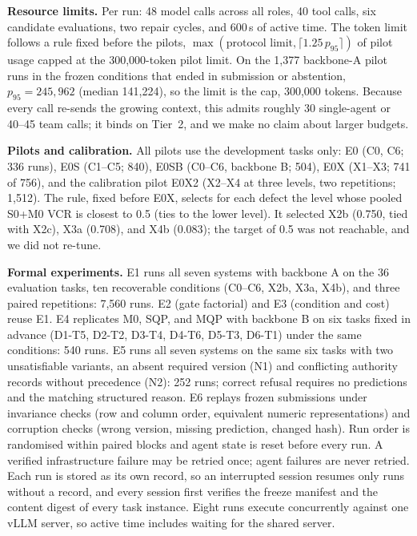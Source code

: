 \documentclass[conference]{IEEEtran}
\newcommand{\sys}[1]{\textsf{#1}}
\begin{document}
\textbf{Resource limits.} Per run: 48 model calls across all roles, 40 tool calls, six candidate evaluations, two
repair cycles, and 600\,s of active time. The token limit follows a rule fixed before the pilots,
$\max(\text{protocol limit},\lceil1.25\,p_{95}\rceil)$ of pilot usage capped at the 300,000-token pilot limit. On the
1,377 backbone-A pilot runs in the frozen conditions that ended in submission or abstention, $p_{95}=245{,}962$
(median 141,224), so the limit is the cap, 300,000 tokens. Because every call re-sends the growing context, this
admits roughly 30 single-agent or 40--45 team calls; it binds on Tier~2, and we make no claim about larger budgets.

\textbf{Pilots and calibration.} All pilots use the development tasks only: E0 (C0, C6; 336 runs), E0S (C1--C5; 840),
E0SB (C0--C6, backbone B; 504), E0X (X1--X3; 741 of 756), and the calibration pilot E0X2 (X2--X4 at three levels,
two repetitions; 1,512). The rule, fixed before E0X, selects for each defect the level whose pooled \sys{S0}+\sys{M0}
VCR is closest to 0.5 (ties to the lower level). It selected X2b (0.750, tied with X2c), X3a (0.708), and X4b
(0.083); the target of 0.5 was not reachable, and we did not re-tune.

\textbf{Formal experiments.} E1 runs all seven systems with backbone A on the 36 evaluation tasks, ten recoverable
conditions (C0--C6, X2b, X3a, X4b), and three paired repetitions: 7,560 runs. E2 (gate factorial) and E3 (condition
and cost) reuse E1. E4 replicates \sys{M0}, \sys{SQP}, and \sys{MQP} with backbone B on six tasks fixed in advance
(D1-T5, D2-T2, D3-T4, D4-T6, D5-T3, D6-T1) under the same conditions: 540 runs. E5 runs all seven systems on the same
six tasks with two unsatisfiable variants, an absent required version (N1) and conflicting authority records without
precedence (N2): 252 runs; correct refusal requires no predictions and the matching structured reason. E6 replays
frozen submissions under invariance checks (row and column order, equivalent numeric representations) and corruption
checks (wrong version, missing prediction, changed hash). Run order is randomised within paired blocks and agent
state is reset before every run. A verified infrastructure failure may be retried once; agent failures are never
retried. Each run is stored as its own record, so an interrupted session resumes only runs without a record, and
every session first verifies the freeze manifest and the content digest of every task instance. Eight runs execute
concurrently against one vLLM server, so active time includes waiting for the shared server.
\end{document}
